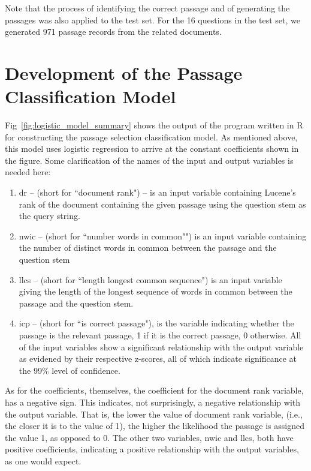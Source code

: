 Note that the process of identifying the correct passage and of generating the passages was also applied to the test set.  For the 16 questions in the test set, we generated 971 passage records from the related documents.


\section{Development of the Passage Classification Model}

Fig~\ref{fig:logistic_model_summary} shows the output of the program written in R \cite{james_2013_introduction_ch4} for constructing the passage selection classification model.  As mentioned above, this model uses logistic regression to arrive at the constant coefficients shown in the figure.  Some clarification of the names of the input and output variables is needed here:  

\begin{enumerate}
\item dr -- (short for ``document rank") -- is an input variable containing Lucene's rank of the document containing the given passage using the question stem as the query string.
\item nwic -- (short for ``number words in common"") is an input variable containing the number of distinct words in common between the passage and the question stem
\item llcs -- (short for ``length longest common sequence") is an input variable giving the length of the longest sequence of words in common between the passage and the question stem.  
\item icp -- (short for ``is correct passage"), is the variable indicating whether the passage is the relevant passage, 1 if it is the correct passage, 0 otherwise.  All of the input variables show a significant relationship with the output variable as evidened by their respective z-scores, all of which indicate significance at the 99\% level of confidence.
\end{enumerate}

As for the coefficients, themselves, the coefficient for the document rank variable, has a negative sign.  This indicates, not surprisingly, a negative relationship with the output variable.  That is, the lower the value of document rank variable, (i.e., the closer it is to the value of 1), the higher the likelihood the passage is assigned the value 1, as opposed to 0.  The other two variables, nwic and llcs, both have positive coefficients, indicating a positive relationship with the output variables, as one would expect.

